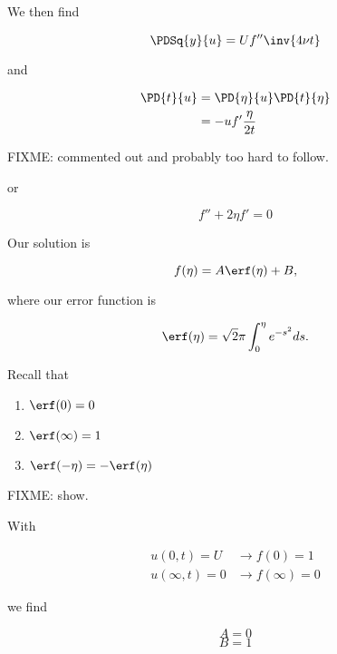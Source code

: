 We then find

\begin{equation}\label{eqn:continuumL16:450}
\PDSq{y}{u} = U f'' \inv{4 \nu t}
\end{equation}

and

\begin{align*}
\PD{t}{u} 
&= \PD{\eta}{u} \PD{t}{\eta} \\
&= - u f' \frac{\eta}{2 t}
\end{align*}

FIXME: commented out and probably too hard to follow.

or

\begin{equation}\label{eqn:continuumL16:490}
f'' + 2 \eta f' = 0
\end{equation}

Our solution is

\begin{equation}\label{eqn:continuumL16:510}
f(\eta) = A \erf(\eta) + B,
\end{equation}

where our error function is

\begin{equation}\label{eqn:continuumL16:530}
\erf(\eta) = \sqrt{2}{\pi} \int_0^\eta e^{-s^2} ds.
\end{equation}

Recall that 

\begin{enumerate}
\item $\erf(0) = 0$
\item $\erf(\infty) = 1$
\item $\erf(-\eta) = -\erf(\eta)$
\end{enumerate}

FIXME: show.

With 

\begin{align*}
u(0, t) = U &\rightarrow f(0) = 1 \\
u(\infty, t) = 0 &\rightarrow f(\infty) = 0
\end{align*}

we find

\begin{equation}\label{eqn:continuumL16:550}
A = 0
\end{equation}
\begin{equation}\label{eqn:continuumL16:570}
B = 1
\end{equation}

